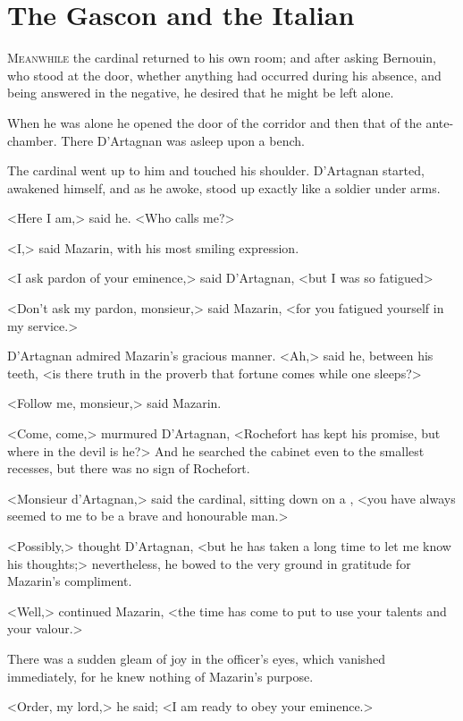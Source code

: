 \chapter{The Gascon and the Italian}

 \lettrine{M}{eanwhile} the cardinal returned to his own room; and after asking Bernouin, who stood at the door, whether anything had occurred during his absence, and being answered in the negative, he desired that he might be left alone.

\zz
When he was alone he opened the door of the corridor and then that of the ante-chamber. There D'Artagnan was asleep upon a bench.

The cardinal went up to him and touched his shoulder. D'Artagnan started, awakened himself, and as he awoke, stood up exactly like a soldier under arms.

<Here I am,> said he. <Who calls me?>

<I,> said Mazarin, with his most smiling expression.

<I ask pardon of your eminence,> said D'Artagnan, <but I was so fatigued\longdash>

<Don't ask my pardon, monsieur,> said Mazarin, <for you fatigued yourself in my service.>

D'Artagnan admired Mazarin's gracious manner. <Ah,> said he, between his teeth, <is there truth in the proverb that fortune comes while one sleeps?>

<Follow me, monsieur,> said Mazarin.

<Come, come,> murmured D'Artagnan, <Rochefort has kept his promise, but where in the devil is he?> And he searched the cabinet even to the smallest recesses, but there was no sign of Rochefort.

<Monsieur d'Artagnan,> said the cardinal, sitting down on a , <you have always seemed to me to be a brave and honourable man.>

<Possibly,> thought D'Artagnan, <but he has taken a long time to let me know his thoughts;> nevertheless, he bowed to the very ground in gratitude for Mazarin's compliment.

<Well,> continued Mazarin, <the time has come to put to use your talents and your valour.>

There was a sudden gleam of joy in the officer's eyes, which vanished immediately, for he knew nothing of Mazarin's purpose.

<Order, my lord,> he said; <I am ready to obey your eminence.>


